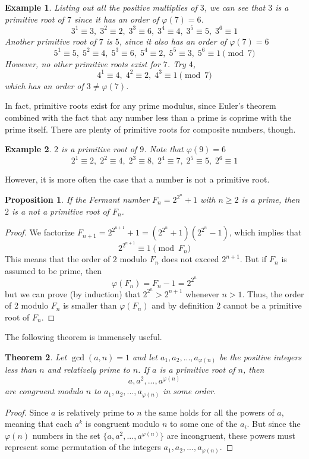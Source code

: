 \documentclass{article}
\newtheorem{theorem}{Theorem}[section]
\newtheorem{proposition}[theorem]{Proposition}
\newtheorem{example}{Example}[section]
\theoremstyle{remark}
\theoremstyle{definition}
\begin{document}
\begin{example}
Listing out all the positive multiplies of $3$, we can see that $3$ is a primitive root of $7$ since it has an order of $\varphi(7) = 6$.  
\[3^1 \equiv 3, \; 3^2 \equiv 2, \; 3^3 \equiv 6, \; 3^4 \equiv 4, \; 3^5 \equiv 5, \; 3^6 \equiv 1\]
Another primitive root of $7$ is $5$, since it also has an order of $\varphi(7) = 6$
\[5^1 \equiv 5, \; 5^2 \equiv 4, \; 5^3 \equiv 6, \; 5^4 \equiv 2, \; 5^5 \equiv 3, \; 5^6 \equiv 1 \pmod{7}\]
However, no other primitive roots exist for $7$. Try $4$, 
\[4^1 \equiv 4, \; 4^2 \equiv 2, \; 4^3 \equiv 1 \pmod{7}\]
which has an order of $3 \neq \varphi(7)$. 
\end{example}

In fact, primitive roots exist for any prime modulus, since Euler's theorem combined with the fact that any number less than a prime is coprime with the prime itself. There are plenty of primitive roots for composite numbers, though. 

\begin{example}
$2$ is a primitive root of $9$. Note that $\varphi(9) = 6$
\[2^1 \equiv 2,\; 2^2 \equiv 4, \;2^3 \equiv 8,\; 2^4 \equiv 7, \; 2^5 \equiv 5, \; 2^6 \equiv 1\]
\end{example}

However, it is more often the case that a number is not a primitive root. 

\begin{proposition}
If the Fermant number $F_n = 2^{2^n} + 1$ with $n\geq 2$ is a prime, then $2$ is a not a primitive root of $F_n$. 
\end{proposition}
\begin{proof}
We factorize $F_{n+1} = 2^{2^{n+1}} + 1 = (2^{2^n} + 1)(2^{2^n} - 1)$, which implies that
\[2^{2^{n+1}} \equiv 1 \pmod{F_n}\]
This means that the order of $2$ modulo $F_n$ does not exceed $2^{n+1}$. But if $F_n$ is assumed to be prime, then
\[\varphi(F_n) = F_n - 1 = 2^{2^n}\]
but we can prove (by induction) that $2^{2^n} > 2^{n+1}$ whenever $n>1$. Thus, the order of $2$ modulo $F_n$ is smaller than $\varphi(F_n)$ and by definition $2$ cannot be a primitive root of $F_n$. 
\end{proof}

The following theorem is immensely useful. 

\begin{theorem}
Let $\gcd(a, n) = 1$ and let $a_1, a_2, ..., a_{\varphi(n)}$ be the positive integers less than $n$ and relatively prime to $n$. If $a$ is a primitive root of $n$, then 
\[a, a^2, ..., a^{\varphi(n)}\]
are congruent modulo $n$ to $a_1, a_2, ..., a_{\varphi(n)}$ in some order. 
\end{theorem}
\begin{proof}
Since $a$ is relatively prime to $n$ the same holds for all the powers of $a$, meaning that each $a^k$ is congruent modulo $n$ to some one of the $a_i$. But since the $\varphi(n)$ numbers in the set $\{a, a^2, ..., a^{\varphi(n)}\}$ are incongruent, these powers must represent some permutation of the integers $a_1, a_2, ..., a_{\varphi(n)}$. 
\end{proof}
\end{document}
